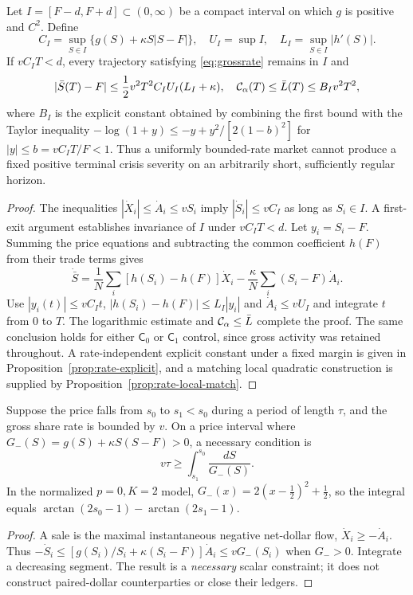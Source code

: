 \documentclass[review,hidelinks,onefignum,onetabnum]{siamonline250211}%
\begin{document}
\begin{theorem}\label{thm:ratequadratic}
Let $I=[F-d,F+d]\subset(0,\infty)$ be a compact interval on
which $g$ is positive and $C^2$. Define
\[
 C_I=\sup_{S\in I}\{g(S)+\kappa S|S-F|\},\quad
 U_I=\sup I,\quad L_I=\sup_{S\in I}|h'(S)|.
\]
If $v C_IT<d$, every trajectory satisfying \eqref{eq:grossrate}
remains in $I$ and
\begin{equation}\label{eq:ratebarrier}
 |\bar S(T)-F|\le\frac12 v^2T^2 C_IU_I(L_I+\kappa),
 \quad \mathcal{C}_\alpha(T)\le\bar L(T)\le B_I v^2T^2,
\end{equation}
where $B_I$ is the explicit constant obtained by combining the
first bound with the Taylor inequality
$-\log(1+y)\le-y+y^2/[2(1-b)^2]$ for
$|y|\le b=v C_IT/F<1$. Thus a uniformly bounded-rate market
cannot produce a fixed positive terminal crisis severity on an
arbitrarily short, sufficiently regular horizon.
\end{theorem}
\begin{proof}
The inequalities $|\dot X_i|\le\dot A_i\le vS_i$ imply
$|\dot S_i|\le v C_I$ as long as $S_i\in I$. A first-exit
argument establishes invariance of $I$ under $vC_IT<d$.
Let $y_i=S_i-F$. Summing the price equations and subtracting
the common coefficient $h(F)$ from their trade terms gives
\[
 \dot{\bar S}=
 \frac1N\sum_i [h(S_i)-h(F)]\dot X_i
 -\frac\kappa N\sum_i(S_i-F)\dot A_i.
\]
Use $|y_i(t)|\le v C_I t$,
$|h(S_i)-h(F)|\le L_I |y_i|$ and
$\dot A_i\le v U_I$ and integrate $t$ from $0$ to $T$.
The logarithmic estimate and $\mathcal{C}_\alpha\le\bar L$
complete the proof. The same conclusion holds for either $\mathsf C_0$
or $\mathsf C_1$ control, since gross activity was retained throughout.
A rate-independent explicit constant under a fixed margin is given in
Proposition~\ref{prop:rate-explicit}, and a matching local quadratic
construction is supplied by Proposition~\ref{prop:rate-local-match}.
\end{proof}

\begin{proposition}\label{prop:pure-sale}
Suppose the price falls from $s_0$ to $s_1<s_0$ during a
period of length $\tau$, and the gross share rate is bounded by $v$.
On a price interval where
$G_-(S)=g(S)+\kappa S(S-F)>0$,
a necessary condition is
\begin{equation}\label{eq:puresell}
 v\tau\ge\int_{s_1}^{s_0}\frac{dS}{G_-(S)}.
\end{equation}
In the normalized $p=0,K=2$ model,
$G_-(x)=2(x-\tfrac12)^2+\tfrac12$, so the integral equals
$\arctan(2s_0-1)-\arctan(2s_1-1)$.
\end{proposition}
\begin{proof}
A sale is the maximal instantaneous negative net-dollar flow,
$\dot X_i\ge-\dot A_i$. Thus
$-\dot S_i\le[g(S_i)/S_i+\kappa(S_i-F)]\dot A_i
\le vG_-(S_i)$ when $G_->0$. Integrate a decreasing
segment. The result is a \emph{necessary} scalar constraint; it does
not construct paired-dollar counterparties or close their ledgers.
\end{proof}
\end{document}
